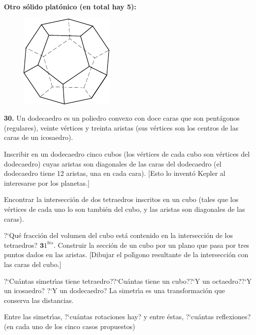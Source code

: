 \documentclass[12pt, spanish]{article}  %
\begin{document}
\newpage
\noindent
{\bf Otro s\'olido plat\'onico (en total hay 5):}
\begin{figure}[h]
\centering
\includegraphics{taskbook-14}\\[2pt]
\end{figure}

\noindent
{\bf 30.} Un dodecaedro es un poliedro convexo con doce caras que son pent\'agonos (regulares), veinte v\'ertices y treinta aristas
 (sus v\'ertices son los centros de las caras de un icosaedro).

Inscribir en un dodecaedro cinco cubos (los v\'ertices de cada cubo son v\'ertices del dodecaedro)
cuyas aristas son diagonales de las caras del dodecaedro (el dodecaedro tiene 12 aristas, una en cada cara).
[Esto lo invent\'o Kepler al interesarse por los planetas.] 

\bigskip
{} Encontrar la intersecci\'on de dos tetraedros inscritos en un cubo (tales que los v\'ertices de cada uno lo son tambi\'en del cubo, y las aristas son diagonales de las caras). 

?`Qu\'e fracci\'on del volumen del cubo est\'a contenido en la intersecci\'on de los tetraedros?
\newline\newline\quad
$\mathbf 31^{bis}.$ Construir la secci\'on de un cubo por un plano que pasa por tres puntos dados en las aristas.
[Dibujar el pol\'{\i}gono resultante de la intersecci\'on con las caras del cubo.]
\begin{figure}[h]
\centering
\end{figure}

 ?`Cu\'antas simetr\'{\i}as tiene tetraedro??`Cu\'antas tiene un cubo??`Y un octaedro??`Y un icosaedro? ?`Y un dodecaedro? La simetr\'{\i}a es una transformaci\'on que conserva las distancias.

Entre las simetr\'{\i}as, ?`cu\'antas rotaciones hay? y entre \'estas, ?`cu\'antas reflexiones? (en cada uno de los cinco casos propuestos)
\end{document}
